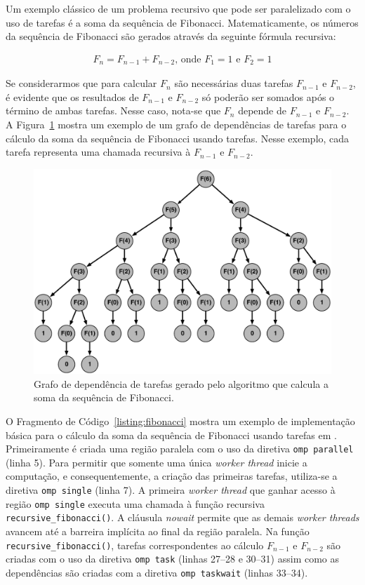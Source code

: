 \documentclass{SBCbookchapter}
\begin{document}
	Um exemplo clássico de um problema recursivo que pode ser
	paralelizado com o uso de tarefas é a soma da sequência de
	Fibonacci. Matematicamente, os números da sequência de Fibonacci são
	gerados através da seguinte fórmula recursiva:
	
	\begin{align*}
		F_n = F_{n-1} + F_{n-2} \text{, onde } F_1=1 \text{ e } F_2=1
	\end{align*}

	Se considerarmos que para calcular $F_n$ são necessárias duas
	tarefas $F_{n-1}$ e $F_{n-2}$, é evidente que os resultados de
	$F_{n-1}$ e $F_{n-2}$ só poderão ser somados após o término de ambas
	tarefas. Nesse caso, nota-se que $F_n$ depende de $F_{n-1}$ e
	$F_{n-2}$. A Figura~\ref{fig:fibonacci} mostra um exemplo de um
	grafo de dependências de tarefas para o cálculo da soma da sequência
	de Fibonacci usando tarefas. Nesse exemplo, cada tarefa representa
	uma chamada recursiva à $F_{n-1}$ e $F_{n-2}$.

		\begin{figure}[t]
			\centering
			\includegraphics[width=0.8\linewidth]{img/fibonacci}
			\caption{Grafo de dependência de tarefas gerado pelo algoritmo que calcula a soma da sequência
			de Fibonacci.}\label{fig:fibonacci}
		\end{figure}

	O Fragmento de Código~\ref{listing:fibonacci} mostra um exemplo de implementação básica para o cálculo da soma da sequência
	de Fibonacci usando tarefas em \openmp. Primeiramente é criada uma região paralela com o uso da diretiva
	\texttt{omp parallel} (linha 5). Para permitir que somente uma única \textit{worker thread} inicie a computação, e
	consequentemente, a criação das primeiras tarefas, utiliza-se a diretiva \texttt{omp single} (linha 7). A primeira
	\textit{worker thread} que ganhar acesso à região \texttt{omp single} executa uma chamada à função recursiva 
	\texttt{recursive\_fibonacci()}. A cláusula \textit{nowait} permite que as demais \textit{worker threads} avancem até
	a barreira implícita ao final da região paralela. Na função \texttt{recursive\_fibonacci()}, tarefas correspondentes ao
	cálculo $F_{n-1}$ e $F_{n-2}$ são criadas com o uso da diretiva \texttt{omp task} (linhas 27--28 e 30--31) assim
	como as dependências são criadas com a diretiva \texttt{omp taskwait} (linhas 33--34).
	
\end{document}
